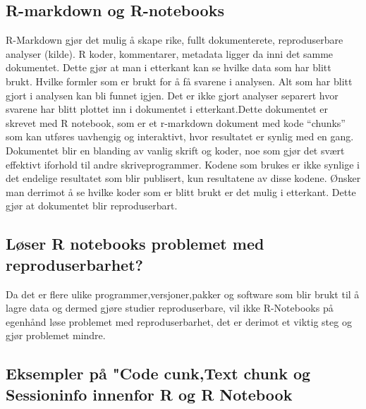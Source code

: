 \documentclass[
  norsk,
]{article}
\begin{document}
\hypertarget{r-markdown-og-r-notebooks}{%
\subsection{\texorpdfstring{\textbf{R-markdown og
R-notebooks}}{R-markdown og R-notebooks}}\label{r-markdown-og-r-notebooks}}

R-Markdown gjør det mulig å skape rike, fullt dokumenterete,
reproduserbare analyser (kilde). R koder, kommentarer, metadata ligger
da inni det samme dokumentet. Dette gjør at man i etterkant kan se
hvilke data som har blitt brukt. Hvilke formler som er brukt for å få
svarene i analysen. Alt som har blitt gjort i analysen kan bli funnet
igjen. Det er ikke gjort analyser separert hvor svarene har blitt
plottet inn i dokumentet i etterkant.Dette dokumentet er skrevet med R
notebook, som er et r-markdown dokument med kode ``chunks'' som kan
utføres uavhengig og interaktivt, hvor resultatet er synlig med en gang.
Dokumentet blir en blanding av vanlig skrift og koder, noe som gjør det
svært effektivt iforhold til andre skriveprogrammer. Kodene som brukes
er ikke synlige i det endelige resultatet som blir publisert, kun
resultatene av disse kodene. Ønsker man derrimot å se hvilke koder som
er blitt brukt er det mulig i etterkant. Dette gjør at dokumentet blir
reproduserbart.

\hypertarget{luxf8ser-r-notebooks-problemet-med-reproduserbarhet}{%
\subsection{\texorpdfstring{\textbf{Løser R notebooks problemet med
reproduserbarhet?}}{Løser R notebooks problemet med reproduserbarhet?}}\label{luxf8ser-r-notebooks-problemet-med-reproduserbarhet}}

Da det er flere ulike programmer,versjoner,pakker og software som blir
brukt til å lagre data og dermed gjøre studier reproduserbare, vil ikke
R-Notebooks på egenhånd løse problemet med reproduserbarhet, det er
derimot et viktig steg og gjør problemet mindre.

\hypertarget{eksempler-puxe5-code-cunktext-chunk-og-sessioninfo-innenfor-r-og-r-notebook}{%
\subsection{\texorpdfstring{\textbf{Eksempler på "Code cunk,Text chunk
og Sessioninfo innenfor R og R
Notebook}}{Eksempler på "Code cunk,Text chunk og Sessioninfo innenfor R og R Notebook}}\label{eksempler-puxe5-code-cunktext-chunk-og-sessioninfo-innenfor-r-og-r-notebook}}
\end{document}
